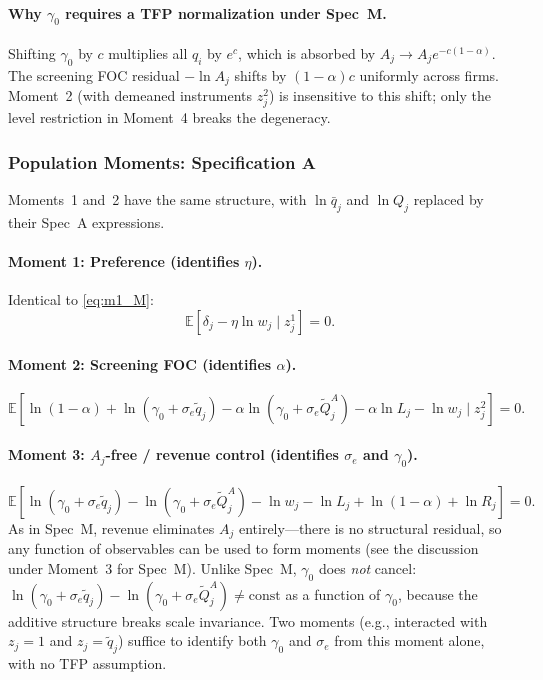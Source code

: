 \documentclass[11pt]{article}
\begin{document}
\paragraph{Why $\gamma_0$ requires a TFP normalization under Spec~M.} Shifting $\gamma_0$ by $c$ multiplies all $q_i$ by $e^c$, which is absorbed by $A_j \to A_je^{-c(1-\alpha)}$. The screening FOC residual $-\ln A_j$ shifts by $(1-\alpha)c$ uniformly across firms. Moment~2 (with demeaned instruments $z_j^2$) is insensitive to this shift; only the level restriction in Moment~4 breaks the degeneracy.

\subsubsection{Population Moments: Specification A}\label{sec:moments_A}

Moments~1 and~2 have the same structure, with $\ln\bar q_j$ and $\ln Q_j$ replaced by their Spec~A expressions.

\paragraph{Moment 1: Preference (identifies $\eta$).} Identical to \eqref{eq:m1_M}:
\begin{equation}\label{eq:m1_A}
\mathbb{E}\!\left[\delta_j - \eta\ln w_j \;\Big|\; z_j^1\right] = 0.
\end{equation}

\paragraph{Moment 2: Screening FOC (identifies $\alpha$).}
\begin{equation}\label{eq:m2_A}
\mathbb{E}\!\left[\ln(1-\alpha) + \ln(\gamma_0+\sigma_e\tilde q_j) - \alpha\ln(\gamma_0+\sigma_e\tilde Q_j^A) - \alpha\ln L_j - \ln w_j \;\Big|\; z_j^2\right] = 0.
\end{equation}

\paragraph{Moment 3: $A_j$-free / revenue control (identifies $\sigma_e$ and $\gamma_0$).}
\begin{equation}\label{eq:m3_A}
\mathbb{E}\!\left[\ln(\gamma_0+\sigma_e\tilde q_j) - \ln(\gamma_0+\sigma_e\tilde Q_j^A) - \ln w_j - \ln L_j + \ln(1-\alpha) + \ln R_j\right] = 0.
\end{equation}
As in Spec~M, revenue eliminates $A_j$ entirely---there is no structural residual, so any function of observables can be used to form moments (see the discussion under Moment~3 for Spec~M). Unlike Spec~M, $\gamma_0$ does \emph{not} cancel: $\ln(\gamma_0+\sigma_e\tilde q_j) - \ln(\gamma_0+\sigma_e\tilde Q_j^A) \neq \text{const}$ as a function of $\gamma_0$, because the additive structure breaks scale invariance. Two moments (e.g., interacted with $z_j = 1$ and $z_j = \tilde q_j$) suffice to identify both $\gamma_0$ and $\sigma_e$ from this moment alone, with no TFP assumption.
\end{document}
